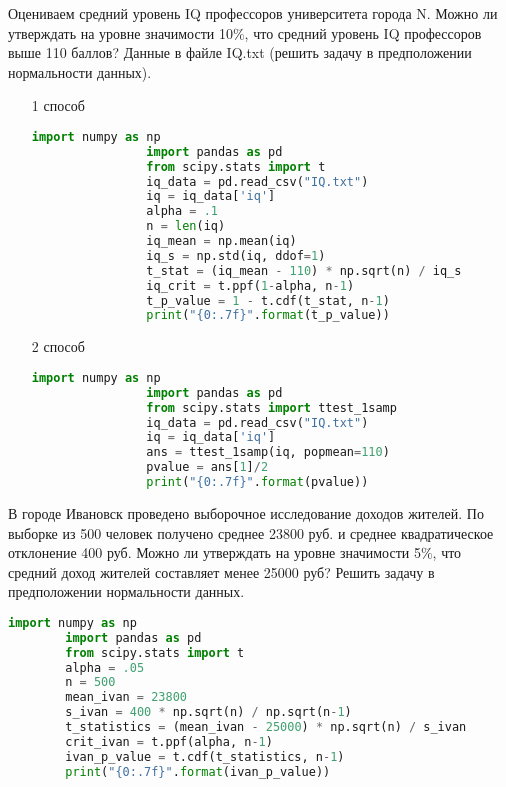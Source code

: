 \begin{problem}
	 Оцениваем средний уровень IQ профессоров университета города N. Можно ли утверждать на уровне значимости 10$\%$, что средний уровень IQ профессоров выше 110 баллов? Данные в файле IQ.txt (решить задачу в предположении нормальности данных).
\end{problem}
\begin{solution}
	\begin{itemize}
		\item[1 способ] 
			\begin{lstlisting}[language=Python]
				import numpy as np
				import pandas as pd
				from scipy.stats import t
				iq_data = pd.read_csv("IQ.txt")
				iq = iq_data['iq']
				alpha = .1
				n = len(iq)
				iq_mean = np.mean(iq)
				iq_s = np.std(iq, ddof=1)
				t_stat = (iq_mean - 110) * np.sqrt(n) / iq_s
				iq_crit = t.ppf(1-alpha, n-1)
				t_p_value = 1 - t.cdf(t_stat, n-1)
				print("{0:.7f}".format(t_p_value))
			\end{lstlisting}
		\item[2 способ] 
			\begin{lstlisting}[language=Python]
				import numpy as np
				import pandas as pd
				from scipy.stats import ttest_1samp
				iq_data = pd.read_csv("IQ.txt")
				iq = iq_data['iq']
				ans = ttest_1samp(iq, popmean=110)
				pvalue = ans[1]/2
				print("{0:.7f}".format(pvalue))
			\end{lstlisting}
	\end{itemize}
\end{solution}

\begin{problem}
	 В городе Ивановск проведено выборочное исследование доходов жителей. По выборке из 500 человек получено среднее 23800 руб. и среднее квадратическое отклонение 400 руб. Можно ли утверждать на уровне значимости 5$\%$, что средний доход жителей составляет менее 25000 руб? Решить задачу в предположении нормальности данных.
\end{problem}
\begin{solution}
	\begin{lstlisting}[language=Python]
		import numpy as np
		import pandas as pd
		from scipy.stats import t
		alpha = .05
		n = 500
		mean_ivan = 23800
		s_ivan = 400 * np.sqrt(n) / np.sqrt(n-1)
		t_statistics = (mean_ivan - 25000) * np.sqrt(n) / s_ivan
		crit_ivan = t.ppf(alpha, n-1)
		ivan_p_value = t.cdf(t_statistics, n-1)
		print("{0:.7f}".format(ivan_p_value))
	\end{lstlisting}
\end{solution}

